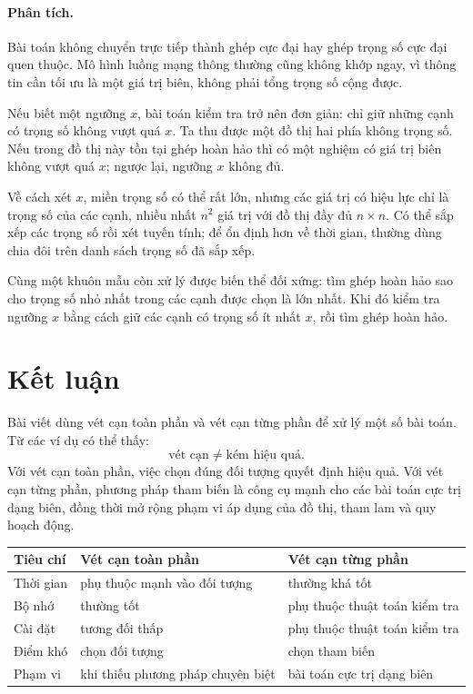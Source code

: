 \documentclass[11pt]{article}
\begin{document}
\paragraph{Phân tích.}
Bài toán không chuyển trực tiếp thành ghép cực đại hay ghép trọng số cực đại
quen thuộc. Mô hình luồng mạng thông thường cũng không khớp ngay, vì thông
tin cần tối ưu là một giá trị biên, không phải tổng trọng số cộng được.

Nếu biết một ngưỡng \(x\), bài toán kiểm tra trở nên đơn giản: chỉ giữ những
cạnh có trọng số không vượt quá \(x\). Ta thu được một đồ thị hai phía không
trọng số. Nếu trong đồ thị này tồn tại ghép hoàn hảo thì có một nghiệm có
giá trị biên không vượt quá \(x\); ngược lại, ngưỡng \(x\) không đủ.

Về cách xét \(x\), miền trọng số có thể rất lớn, nhưng các giá trị có hiệu
lực chỉ là trọng số của các cạnh, nhiều nhất \(n^2\) giá trị với đồ thị đầy
đủ \(n\times n\). Có thể sắp xếp các trọng số rồi xét tuyến tính; để ổn định
hơn về thời gian, thường dùng chia đôi trên danh sách trọng số đã sắp xếp.

Cùng một khuôn mẫu còn xử lý được biến thể đối xứng: tìm ghép hoàn hảo sao
cho trọng số nhỏ nhất trong các cạnh được chọn là lớn nhất. Khi đó kiểm tra
ngưỡng \(x\) bằng cách giữ các cạnh có trọng số ít nhất \(x\), rồi tìm ghép
hoàn hảo.

\section{Kết luận}

Bài viết dùng vét cạn toàn phần và vét cạn từng phần để xử lý một số bài
toán. Từ các ví dụ có thể thấy:
\[
  \text{vét cạn} \ne \text{kém hiệu quả}.
\]
Với vét cạn toàn phần, việc chọn đúng đối tượng quyết định hiệu quả. Với vét
cạn từng phần, phương pháp tham biến là công cụ mạnh cho các bài toán cực
trị dạng biên, đồng thời mở rộng phạm vi áp dụng của đồ thị, tham lam và quy
hoạch động.

\begin{center}
\begin{tabular}{lll}
\textbf{Tiêu chí} & \textbf{Vét cạn toàn phần} & \textbf{Vét cạn từng phần}\\
\hline
Thời gian & phụ thuộc mạnh vào đối tượng & thường khá tốt\\
Bộ nhớ & thường tốt & phụ thuộc thuật toán kiểm tra\\
Cài đặt & tương đối thấp & phụ thuộc thuật toán kiểm tra\\
Điểm khó & chọn đối tượng & chọn tham biến\\
Phạm vi & khi thiếu phương pháp chuyên biệt & bài toán cực trị dạng biên\\
\end{tabular}
\end{center}
\end{document}
